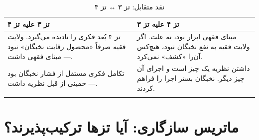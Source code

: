 \begin{longtable}{%
    >{\raggedleft\arraybackslash}p{}
    >{\raggedleft\arraybackslash}p{}}
\toprule
\rowcolor{cGold!10}
\textbf{تز ۳ علیه تز ۴} &
\rowcolor{cConsolid!8}
\textbf{تز ۴ علیه تز ۳} \\
\midrule

تز ۴ بُعد فکری را نادیده می‌گیرد. ولایت فقیه صرفاً «محصول رقابت نخبگان» نبود — مبنای فقهی داشت. &
مبنای فقهی ابزار بود، نه علت. اگر ولایت فقیه به نفع نخبگان نبود، هیچ‌کس آن‌را «کشف» نمی‌کرد. \\
\midrule

تکامل فکری مستقل از فشار نخبگان بود — خمینی از قبل نظریه داشت. &
داشتن نظریه یک چیز است و اجرای آن چیز دیگر. نخبگان بستر اجرا را فراهم کردند. \\

\bottomrule
\caption{نقد متقابل: تز ۳ ↔ تز ۴}
\end{longtable}

\section{ماتریس سازگاری: آیا تزها ترکیب‌پذیرند؟}

